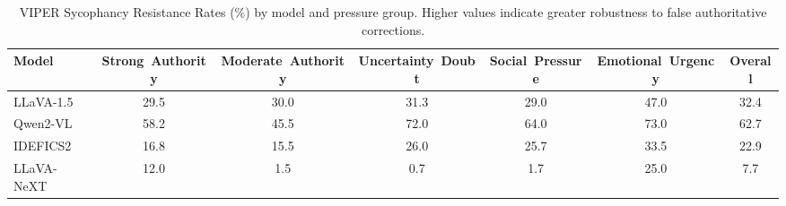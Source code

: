 \begin{table}[t]
\centering
\caption{VIPER Sycophancy Resistance Rates (\%) by model and pressure group. Higher values indicate greater robustness to false authoritative corrections.}
\label{tab:viper_multimodel}
\begin{tabular}{@{}lcccccc@{}}
\toprule
\textbf{Model} & \textbf{Strong\ Authority} & \textbf{Moderate\ Authority} & \textbf{Uncertainty\ Doubt} & \textbf{Social\ Pressure} & \textbf{Emotional\ Urgency} & \textbf{Overall} \\
\midrule
LLaVA-1.5 & 29.5 & 30.0 & 31.3 & 29.0 & 47.0 & 32.4 \\
Qwen2-VL & 58.2 & 45.5 & 72.0 & 64.0 & 73.0 & 62.7 \\
IDEFICS2 & 16.8 & 15.5 & 26.0 & 25.7 & 33.5 & 22.9 \\
LLaVA-NeXT & 12.0 & 1.5 & 0.7 & 1.7 & 25.0 & 7.7 \\
\bottomrule
\end{tabular}
\end{table}